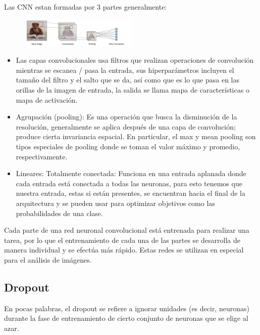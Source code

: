 \documentclass[10pt, fleqn, journal]{IEEEtran}
\newcommand \Quote              {\qq}                           %
\theoremstyle{break}                                            %
\begin{document}
      Las CNN estan formadas por 3 partes generalmente:
      \begin{figure}[ht!]
          \centering
          \includegraphics[width=0.5\textwidth]{bear}
      \end{figure}

      \begin{itemize}
          \item 
              Las capas convolucionales usa filtros que realizan operaciones de convolución mientras se
              escanea / pasa la \Quote{imagen} entrada, sus hiperparámetros incluyen el tamaño del filtro y el salto que se da,
              así como que es lo que pasa en las orillas de la imagen de entrada, la salida se llama mapa de características
              o mapa de activación.
          \item 
              Agrupación (pooling): Es una operación que busca la disminución de la resolución, 
              generalmente se aplica después de una capa de convolución; produce cierta invariancia espacial. 
              En particular, el max y mean pooling son tipos especiales de pooling donde 
              se toman el valor máximo y promedio, respectivamente.
          \item Lineares:
              Totalmente conectada: Funciona en una entrada aplanada donde cada entrada está conectada a todas
              las neuronas, para esto tenemos que \Quote{espagetificar} nuestra entrada, estas si están presentes,
              se encuentran hacia el final de la arquitectura y se pueden usar para optimizar objetivos
              como las probabilidades de una clase.
      \end{itemize}

      Cada parte de una red neuronal convolucional está entrenada para realizar una tarea, 
      por lo que el entrenamiento de cada una de las partes se desarrolla de manera individual 
      y se efectúa más rápido. Estas redes se utilizan en especial para el análisis de imágenes.

    \subsection{Dropout}
      En pocas palabras, el dropout se refiere a ignorar unidades (es decir, neuronas) durante la fase de 
      entrenamiento de cierto conjunto de neuronas que se elige al azar. 
      
\end{document}

